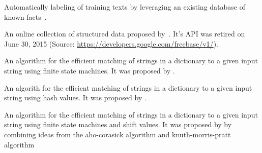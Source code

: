 
{%
  Automatically labeling of training texts by leveraging an existing database of known facts~\citep{reschke2014event}.
}

{%
  An online collection of structured data proposed by~\citep{bollacker2008freebase}.
  It's API was retired on June 30, 2015 (Source: \url{https://developers.google.com/freebase/v1/}).
}


{%
  An algorithm for the efficient matching of strings in a dictionary to a given input string using finite state machines.
  It was proposed by \citet{aho1975efficient}.
}

{%
  An algorith for the efficient matching of strings in a dictionary to a given input string using hash values.
  It was proposed by \citet{karp1987efficient}.
}

{%
  An algorithm for the efficient matching of strings in a dictionary to a given input string using finite state machines and shift values.
  It was proposed by \citet{commentz1979string} by combining ideas from the \gls{aho-corasick algorithm} and \gls{knuth-morris-pratt algorithm}
}

{%
}

{%
}

{%
}

{%
}

{%
}

{%
}

{%
}

{%
}

{%
}

